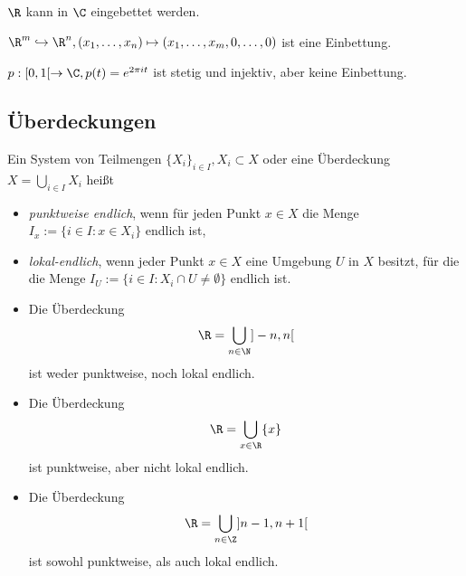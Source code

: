 \begin{ex}
	$\R$ kann in $\C$ eingebettet werden.
\end{ex}


\begin{ex}
	$\R^m \injto \R^n, (x_1, \dotsc, x_n) \mapsto (x_1, \dotsc, x_m, 0, \dotsc, 0)$ ist eine Einbettung.

	$p: [0,1[ \to \C, p(t) = e^{2\pi i t}$ ist stetig und injektiv, aber keine Einbettung.
\end{ex}

\subsection{Überdeckungen}

\begin{df}
	Ein System von Teilmengen $\{X_i\}_{i\in I}, X_i \subset X$ oder eine Überdeckung $X = \bigcup_{i\in I} X_i$ heißt
	\begin{itemize}
		\item
			\emph{punktweise endlich}, wenn für jeden Punkt $x \in X$ die Menge $I_x := \{ i \in I : x \in X_i \}$ endlich ist,
		\item
			\emph{lokal-endlich}, wenn jeder Punkt $x \in X$ eine Umgebung $U$ in $X$ besitzt, für die die Menge $I_U := \{ i \in I : X_i \cap U \neq \emptyset \}$ endlich ist.
	\end{itemize}
\end{df}

\begin{ex}
	\begin{itemize}
		\item
			Die Überdeckung
			\[
				\R = \bigcup_{n \in \N} ]-n, n[
			\]
			ist weder punktweise, noch lokal endlich.
		\item
			Die Überdeckung
			\[
				\R = \bigcup_{x \in \R} \{x\}
			\]
			ist punktweise, aber nicht lokal endlich.
		\item
			Die Überdeckung
			\[
				\R = \bigcup_{n\in \Z} ]n-1, n+ 1[
			\]
			ist sowohl punktweise, als auch lokal endlich.
	\end{itemize}
\end{ex}


